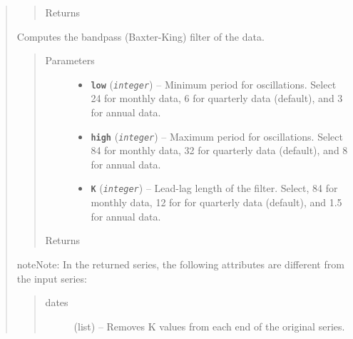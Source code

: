 \documentclass[letterpaper,10pt,english]{sphinxmanual}
\begin{document}
\begin{fulllineitems}
\begin{quote}
\begin{fulllineitems}
\begin{quote}
\begin{description}
\begin{itemize}
\end{itemize}

\item[{Returns}] \leavevmode
{\hyperref[series_class:fredpy.series]{}}

\end{description}\end{quote}

\end{fulllineitems}


\begin{fulllineitems}
\label{series_class:fredpy.series.bpfilter}
Computes the bandpass (Baxter-King) filter of the data.
\begin{quote}\begin{description}
\item[{Parameters}] \leavevmode\begin{itemize}
\item {} 
\textbf{\texttt{low}} (\emph{\texttt{integer}}) -- Minimum period for oscillations. Select 24 for monthly data, 6 for quarterly data (default), and 3 for annual data.

\item {} 
\textbf{\texttt{high}} (\emph{\texttt{integer}}) -- Maximum period for oscillations. Select 84 for monthly data, 32 for quarterly data (default), and 8 for annual data.

\item {} 
\textbf{\texttt{K}} (\emph{\texttt{integer}}) -- Lead-lag length of the filter. Select, 84 for monthly data, 12 for for quarterly data (default), and 1.5 for annual data.

\end{itemize}

\item[{Returns}] \leavevmode
{\hyperref[series_class:fredpy.series]{}}

\end{description}\end{quote}

\begin{notice}{note}{Note:}
In the returned series, the following attributes are different from the input series:
\begin{quote}\begin{description}
\item[{dates}] \leavevmode
(list) --  Removes K values from each end of the original series.


\end{description}
\end{quote}
\end{notice}
\end{fulllineitems}
\end{quote}
\end{fulllineitems}
\end{document}
